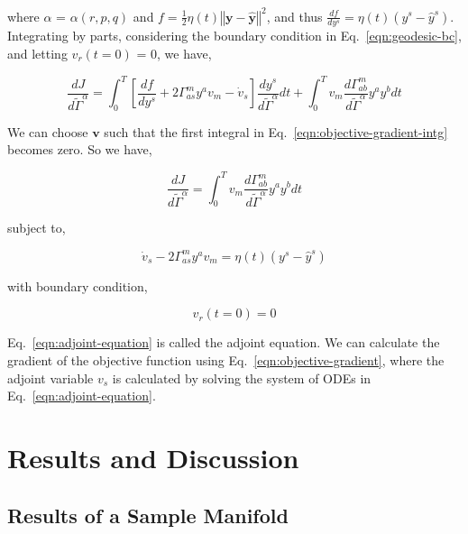 \documentclass{article}
\begin{document}
where $\alpha$ = $\alpha(r,p,q)$ and $f = \frac{1}{2} \eta(t)
\left\Vert\boldsymbol{y} - \hat{\boldsymbol{y}}\right\Vert^{2}$, and
thus $\frac{df}{dy^{s}} = \eta(t) \left( y^{s} - \hat{y}^{s}
\right)$. Integrating by parts, considering the boundary condition in
Eq.~\ref{eqn:geodesic-bc}, and letting $v_{r}(t = 0)$ = 0, we have,

\begin{equation}\label{eqn:objective-gradient-intg}
\frac{d J}{d \tilde{\Gamma}^{\alpha}} = \int_{0}^{T} \left[
  \frac{df}{dy^{s}} + 2 \Gamma^{m}_{as} y^{a} v_{m} - \dot{v}_{s}
  \right] \frac{d y^{s}}{d \tilde{\Gamma}^{\alpha}} dt + \int_{0}^{T}
v_{m} \frac{d \Gamma^{m}_{ab}}{d \tilde{\Gamma}^{\alpha}} y^{a} y^{b}
dt
\end{equation}

We can choose $\boldsymbol{v}$ such that the first integral in
Eq.~\ref{eqn:objective-gradient-intg} becomes zero. So we have,

\begin{equation}\label{eqn:objective-gradient}
\frac{d J}{d \tilde{\Gamma}^{\alpha}} = \int_{0}^{T} v_{m} \frac{d
  \Gamma^{m}_{ab}}{d \tilde{\Gamma}^{\alpha}} y^{a} y^{b} dt
\end{equation}

subject to,

\begin{equation}\label{eqn:adjoint-equation}
\dot{v}_{s} - 2 \Gamma^{m}_{as} y^{a} v_{m} = \eta(t) ( y^{s} -
\hat{y}^{s} )
\end{equation}

with boundary condition,

\begin{equation}\label{eqn:adjoint-bc}
v_{r}( t = 0 ) = 0  
\end{equation}

Eq.~\ref{eqn:adjoint-equation} is called the adjoint equation. We can
calculate the gradient of the objective function using
Eq.~\ref{eqn:objective-gradient}, where the adjoint variable $v_{s}$
is calculated by solving the system of ODEs in
Eq.~\ref{eqn:adjoint-equation}.
  
\section{Results and Discussion}\label{section:results-discussion}

\subsection{Results of a Sample Manifold}\label{subsection:some-results}
\end{document}
